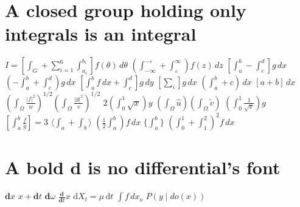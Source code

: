 \documentclass{article}
\begin{document}
\section{A closed group holding only integrals is an integral}
$I=\left[\int_G+\sum_{i=1}^6\int_{a_i}^{b_i}\right]f(\theta)\,d\theta$ $\left(\int_{-\infty}^{-\varepsilon}+\int_\varepsilon^\infty\right)f(z)\,dz$
$[\int_a^b-\int_c^d]g\,dx$ $(-\int_a^b+\int_c^d)g\,dx$
$[\int_a^b f\,dx+\int_c^d]g\,dy$ $[\sum_i]g\,dx$ $(\int_a^b+c)\,dx$ $[a+b]\,dx$
$\left(\int_\Omega\frac{|f|^2}{w}\right)^{1/2}\left(\int_\Omega\frac{|g|^2}{v}\right)^{1/2}$ $2\left(\int_0^1\sqrt{x}\right)y$
$\left(\int_\Omega\hat u\right)\left(\int_\Omega\tilde v\right)$ $\left(\int_0^1\frac{1}{\sqrt{x}}\right)g$ $\left[\int_a^b\frac{f}{g}\right]=3$
$\langle\int_a+\int_b\rangle$ $(\frac12\int_a^b) f\,dx$ $\{\int_a^b\}$ $\left(\int_0^1+\int_1^2\right)^2 f\,dx$

\section{A bold d is no differential's font}
$\mathbf{d}x$ $x+\mathbf{d}t$ $\mathbf{d}\omega$ $\frac{\mathbf{d}}{\mathbf{d}t}x$
{\boldmath $\mathrm{d}X_t=\mu\,\mathrm{d}t$}
$\int f\,dx_o$ $P(y\mid do(x))$
\end{document}
